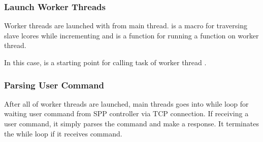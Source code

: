 \documentclass[a4paper,11pt,openany,oneside,english]{sphinxmanual}
\begin{document}
\subsubsection{Launch Worker Threads}
\label{\detokenize{design/impl/spp_nfv:launch-worker-threads}}
Worker threads are launched with  from main thread.
 is a macro for traversing slave lcores while
incrementing  and  is a function
for running a function on worker thread.

\begin{sphinxVerbatim}[commandchars=\\\{\},formatcom=\footnotesize]
  
 
          
\end{sphinxVerbatim}

In this case,  is a starting point for calling task of worker
thread .

\begin{sphinxVerbatim}[commandchars=\\\{\},formatcom=\footnotesize]
 
  
         
\end{sphinxVerbatim}


\subsubsection{Parsing User Command}
\label{\detokenize{design/impl/spp_nfv:parsing-user-command}}
After all of worker threads are launched, main threads goes into while
loop for waiting user command from SPP controller via TCP connection.
If receiving a user command, it simply parses the command and make a response.
It terminates the while loop if it receives  command.
\end{document}
